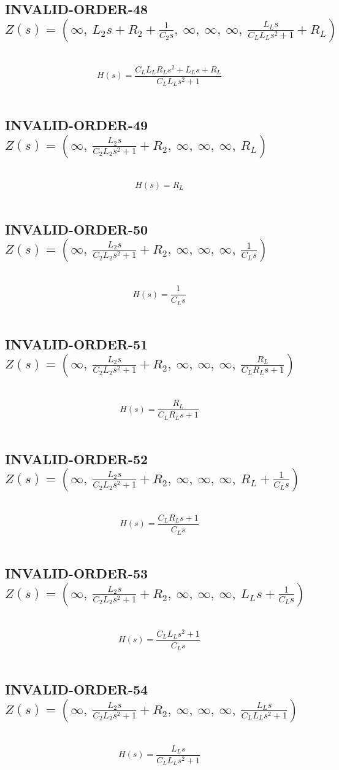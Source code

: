 \documentclass{article}
\begin{document}
\subsection{INVALID-ORDER-48 $Z(s) = \left( \infty, \  L_{2} s + R_{2} + \frac{1}{C_{2} s}, \  \infty, \  \infty, \  \infty, \  \frac{L_{L} s}{C_{L} L_{L} s^{2} + 1} + R_{L}\right)$ } \ 
\textbf{\[H(s) = \frac{C_{L} L_{L} R_{L} s^{2} + L_{L} s + R_{L}}{C_{L} L_{L} s^{2} + 1}\] } \ 
\subsection{INVALID-ORDER-49 $Z(s) = \left( \infty, \  \frac{L_{2} s}{C_{2} L_{2} s^{2} + 1} + R_{2}, \  \infty, \  \infty, \  \infty, \  R_{L}\right)$ } \ 
\textbf{\[H(s) = R_{L}\] } \ 
\subsection{INVALID-ORDER-50 $Z(s) = \left( \infty, \  \frac{L_{2} s}{C_{2} L_{2} s^{2} + 1} + R_{2}, \  \infty, \  \infty, \  \infty, \  \frac{1}{C_{L} s}\right)$ } \ 
\textbf{\[H(s) = \frac{1}{C_{L} s}\] } \ 
\subsection{INVALID-ORDER-51 $Z(s) = \left( \infty, \  \frac{L_{2} s}{C_{2} L_{2} s^{2} + 1} + R_{2}, \  \infty, \  \infty, \  \infty, \  \frac{R_{L}}{C_{L} R_{L} s + 1}\right)$ } \ 
\textbf{\[H(s) = \frac{R_{L}}{C_{L} R_{L} s + 1}\] } \ 
\subsection{INVALID-ORDER-52 $Z(s) = \left( \infty, \  \frac{L_{2} s}{C_{2} L_{2} s^{2} + 1} + R_{2}, \  \infty, \  \infty, \  \infty, \  R_{L} + \frac{1}{C_{L} s}\right)$ } \ 
\textbf{\[H(s) = \frac{C_{L} R_{L} s + 1}{C_{L} s}\] } \ 
\subsection{INVALID-ORDER-53 $Z(s) = \left( \infty, \  \frac{L_{2} s}{C_{2} L_{2} s^{2} + 1} + R_{2}, \  \infty, \  \infty, \  \infty, \  L_{L} s + \frac{1}{C_{L} s}\right)$ } \ 
\textbf{\[H(s) = \frac{C_{L} L_{L} s^{2} + 1}{C_{L} s}\] } \ 
\subsection{INVALID-ORDER-54 $Z(s) = \left( \infty, \  \frac{L_{2} s}{C_{2} L_{2} s^{2} + 1} + R_{2}, \  \infty, \  \infty, \  \infty, \  \frac{L_{L} s}{C_{L} L_{L} s^{2} + 1}\right)$ } \ 
\textbf{\[H(s) = \frac{L_{L} s}{C_{L} L_{L} s^{2} + 1}\] } \ 
\end{document}
